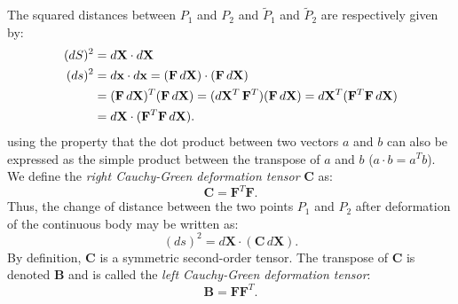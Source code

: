 The squared distances between $P_{1}$ and $P_{2}$ and $\tilde{P}_{1}$ and $\tilde{P}_{2}$ are respectively given by:
\begin{align}
(dS)^2 &= d\mathbf{X} \cdot d\mathbf{X} \label{chap2:dS} \\
(ds)^2 &= d\mathbf{x} \cdot d\mathbf{x} = (\mathbf{F} \, d\mathbf{X}) \cdot (\mathbf{F} \, d\mathbf{X}) \notag \\
&= (\mathbf{F} \, d\mathbf{X})^T (\mathbf{F} \, d\mathbf{X}) = (d\mathbf{X}^T \, \mathbf{F}^T) (\mathbf{F} \, d\mathbf{X}) = d\mathbf{X}^T (\mathbf{F}^T \mathbf{F} \, d\mathbf{X}) \notag \\
&= d\mathbf{X} \cdot (\mathbf{F}^T \mathbf{F} \, d\mathbf{X}).
\end{align}
using the property that the dot product between two vectors $a$ and $b$ can also be expressed as the simple product between the transpose of $a$ and $b$ ($a \cdot b = a^T b$). We define the \emph{right Cauchy-Green deformation tensor} $\mathbf{C}$ as:
\begin{equation}
\mathbf{C} = \mathbf{F}^T \mathbf{F}.
\end{equation}
Thus, the change of distance between the two points $P_{1}$ and $P_{2}$ after deformation of the continuous body may be written as:
\begin{equation}
\label{chap2:ds}
(ds)^2 = d\mathbf{X} \cdot (\mathbf{C} \, d\mathbf{X}).
\end{equation}
By definition, $\mathbf{C}$ is a symmetric second-order tensor. The transpose of $\mathbf{C}$ is denoted $\mathbf{B}$ and is called the \emph{left Cauchy-Green deformation tensor}:
\begin{equation}
\mathbf{B} = \mathbf{F} \mathbf{F}^T.
\end{equation}

	
